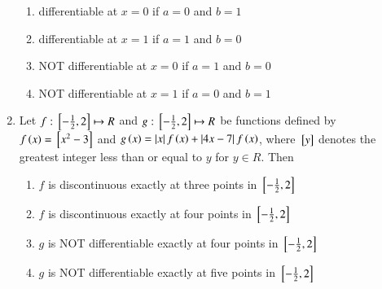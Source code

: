\documentclass[journal]{IEEEtran}
\numberwithin{equation}{enumi}
\numberwithin{figure}{enumi}
\begin{document}
\begin{enumerate}
    \hfill{}
    
    \begin{enumerate}

        \item differentiable at $x=0$ if $a=0$ and $b=1$
        \item differentiable at $x=1$ if $a=1$ and $b=0$
        \item {NOT} differentiable at $x=0$ if $a=1$ and $b=0$
        \item {NOT} differentiable at $x=1$ if $a=0$ and $b=1$
    \end{enumerate}


    \item 
	    Let $f:{}\left[-\frac{1}{2}, 2\right]\mapsto R$ and $g:{}\left[-\frac{1}{2}, 2\right]\mapsto R$ be functions defined by $f\left(x\right)={}\left[x^2-3\right]$ and $g\left(x\right)=\left\vert x\right\vert f\left(x\right)+\left\vert4x-7\right\vert f\left(x\right)$, where ${}\left[y\right]$ denotes the greatest integer less than or equal to $y$ for $y\in R$. Then 

    \hfill{}
    
    \begin{enumerate}
        
        \item $f$ is discontinuous exactly at three points in ${}\left[-\frac{1}{2}, 2\right]$
        \item $f$ is discontinuous exactly at four points in ${}\left[-\frac{1}{2}, 2\right]$
        \item $g$ is NOT differentiable exactly at four points in ${}\left[-\frac{1}{2}, 2\right]$
        \item $g$ is NOT differentiable exactly at five points in ${}\left[-\frac{1}{2}, 2\right]$
    \end{enumerate}

\end{enumerate}
\end{document}
